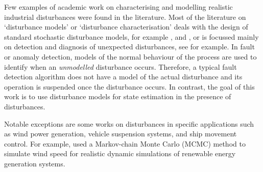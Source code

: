 
Few examples of academic work on characterising and modelling realistic industrial disturbances were found in the literature. Most of the literature on `disturbance models' or `disturbance characterisation' deals with the design of standard stochastic disturbance models, for example \cite{muske_disturbance_2002}, and \cite{pannocchia_robust_2003}, or is focussed mainly on detection and diagnosis of unexpected disturbances, see \cite{thornhill_advances_2007} for example. In fault or anomaly detection, models of the normal behaviour of the process are used to identify when an \textit{unmodelled} disturbance occurs. Therefore, a typical fault detection algorithm does not have a model of the actual disturbance and its operation is suspended once the disturbance occurs. In contrast, the goal of this work is to use disturbance models for state estimation in the presence of disturbances.

Notable exceptions are some works on disturbances in specific applications such as wind power generation, vehicle suspension systems, and ship movement control. For example, \cite{papaefthymiou_mcmc_2008} used a Markov-chain Monte Carlo (MCMC) method to simulate wind speed for realistic dynamic simulations of renewable energy generation systems.

